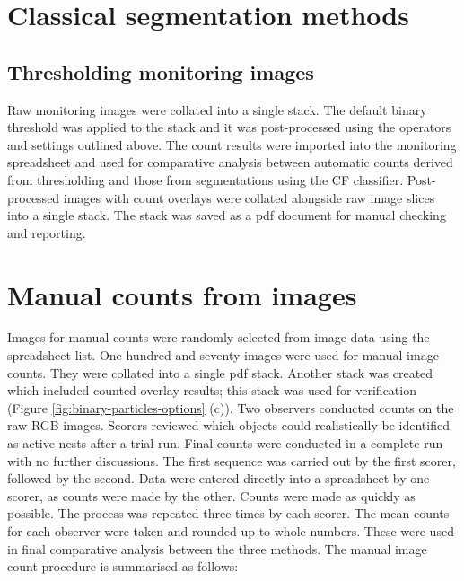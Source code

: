 \section{Classical segmentation methods} 


\subsection{Thresholding monitoring images}
Raw monitoring images were collated into a single stack. The default binary threshold was applied to the stack and it was post-processed using the operators and settings outlined above. The count results were imported into the monitoring spreadsheet and used for comparative analysis between automatic counts derived from thresholding and those from segmentations using the CF classifier. Post-processed images with count overlays were collated alongside raw image slices into a single stack. The stack was saved as a pdf document for manual checking and reporting. 

\section{Manual counts from images}
Images for manual counts were randomly selected from image data using the spreadsheet list. One hundred and seventy images were used for manual image counts. They were collated into a single pdf stack. Another stack was created which included counted overlay results; this stack was used for verification (Figure \ref{fig:binary-particles-options} (c)). Two observers conducted counts on the raw \ac{RGB} images. Scorers reviewed which objects could realistically be identified as active nests after a trial run. 
Final counts were conducted in a complete run with no further discussions. The first sequence was carried out by the first scorer, followed by the second. Data were entered directly into a spreadsheet by one scorer, as counts were made by the other. Counts were made as quickly as possible. The process was repeated three times by each scorer. The mean counts for each observer were taken and rounded up to whole numbers. These were used in final comparative analysis between the three methods. The manual image count procedure is summarised as follows:

